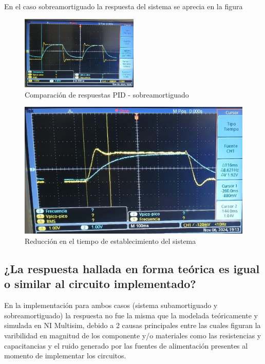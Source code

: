 \documentclass[conference]{IEEEtran}
\begin{document}
	En el caso sobreamortiguado la respuesta del sistema se aprecia en la figura
	
	\begin{figure}
		\centering
		\includegraphics[width=0.5\textwidth]{media/sobre-respuesta-general.png}
		\caption{Comparación de respuestas PID - sobreamortiguado}
		\label{fig:sobre-respuesta-general}
	\end{figure}
	
	\begin{figure}
		\centering
		\includegraphics[width=0.9\linewidth]{media/sobre-ts-116.png}
		\caption{Reducción en el tiempo de establecimiento del sistema}
		\label{fig:sobre-ts-116}
	\end{figure}
	
	\subsection{\textbf{¿La respuesta hallada en forma teórica es igual o similar al circuito implementado?}}
	
	En la implementación para ambos casos (sistema subamortiguado y sobreamortiguado) la respuesta no fue la misma que la modelada teóricamente y simulada en NI Multisim, debido a 2 causas principales entre las cuales figuran la varibilidad en magnitud de los componente y/o materiales como las resistencias y capacitancias y el ruido generado por las fuentes de alimentación presentes al momento de implementar los circuitos.
	
\end{document}
